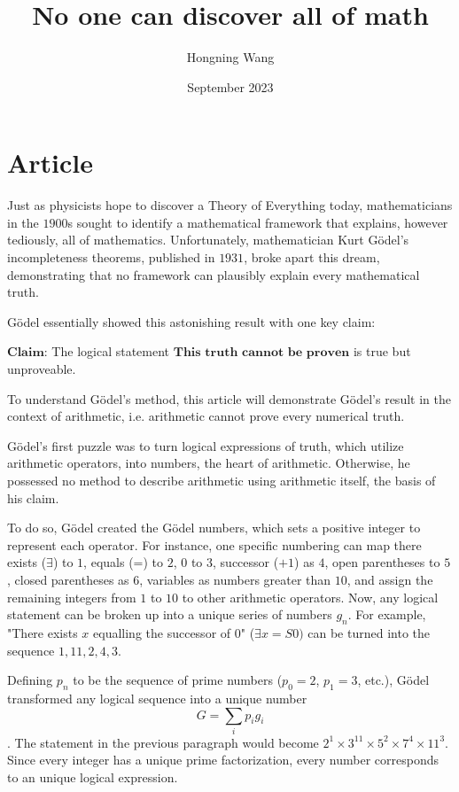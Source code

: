 \documentclass{article}
\title{No one can discover all of math}
\author{Hongning Wang}
\date{September 2023}
\begin{document}
\maketitle

\section{Article}
Just as physicists hope to discover a Theory of Everything today, mathematicians in the $1900$s sought to identify a mathematical framework that explains, however tediously, all of mathematics. Unfortunately, mathematician Kurt Gödel's incompleteness theorems, published in $1931$, broke apart this dream, demonstrating that no framework can plausibly explain every mathematical truth. 

Gödel essentially showed this astonishing result with one key claim: 

$\textbf{Claim:}$ The logical statement $\textbf{This truth cannot be proven}$ is true but unproveable.

To understand Gödel's method, this article will demonstrate Gödel's result in the context of arithmetic, i.e. arithmetic cannot prove every numerical truth. 

Gödel's first puzzle was to turn logical expressions of truth, which utilize arithmetic operators, into numbers, the heart of arithmetic. Otherwise, he possessed no method to describe arithmetic using arithmetic itself, the basis of his claim. 

To do so, Gödel created the Gödel numbers, which sets a positive integer to represent each operator. For instance, one specific numbering can map there exists ($\exists$) to $1$, equals (=) to $2$, $0$ to $3$, successor ($+1$) as $4$, open parentheses to $5$, closed parentheses as $6$, variables as numbers greater than $10$, and assign the remaining integers from $1$ to $10$ to other arithmetic operators. Now, any logical statement can be broken up into a unique series of numbers $g_n$. For example, "There exists $x$ equalling the successor of $0$" ($\exists x = S0)$ can be turned into the sequence $1, 11, 2, 4, 3.$

Defining $p_n$ to be the sequence of prime numbers ($p_0 = 2$, $p_1 = 3$, etc.), Gödel transformed any logical sequence into a unique number \[G = \sum_{i} p_i g_i\]. The statement in the previous paragraph would become $2^1 \times 3^{11} \times 5^2 \times 7^4 \times 11^3$. Since every integer has a unique prime factorization, every number corresponds to an unique logical expression. 
\end{document}
